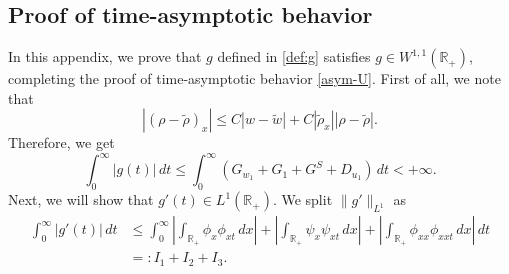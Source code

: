 \documentclass[11pt,reqno]{amsart}
\numberwithin{equation}{section} %
\newcommand{\R}{\mathbb{R}}
\begin{document}
\begin{appendix}
\section{Proof of time-asymptotic behavior}\label{sec:app-A}

In this appendix, we prove that $g$ defined in \eqref{def:g} satisfies $g\in W^{1,1}(\R_+)$, completing the proof of time-asymptotic behavior \eqref{asym-U}. First of all, we note that
\[|(\rho-\tilde{\rho})_x|\le C|w-\tilde{w}|+C|\tilde{\rho}_x||\rho-\tilde{\rho}|.\]
Therefore, we get
\[\int_0^\infty |g(t)|\,dt \le \int_0^\infty (G_{w_1}+G_1+G^S+D_{u_1})\,dt<+\infty.\]
Next, we will show that $g'(t)\in L^1(\R_+)$. We split $\|g'\|_{L^1}$ as
\begin{align*}
	\int_0^\infty |g'(t)|\,dt&\le \int_0^\infty \left|\int_{\R_+}\phi_x\phi_{xt}\,dx\right|+\left|\int_{\R_+}\psi_x\psi_{xt}\,dx\right|+\left|\int_{\R_+}\phi_{xx}\phi_{xxt}\,dx\right|\,dt\\
	&=:I_{1}+I_{2}+I_{3}.
\end{align*}


\end{appendix}
\end{document}
